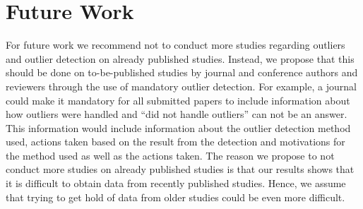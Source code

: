 ﻿\section{Future Work}
For future work we recommend not to conduct more studies regarding outliers and outlier detection on already published studies. Instead, we propose that this should be done on to-be-published studies by journal and conference authors and reviewers through the use of mandatory outlier detection. For example, a journal could make it mandatory for all submitted papers to include information about how outliers were handled and ``did not handle outliers'' can not be an answer. This information would include information about the outlier detection method used, actions taken based on the result from the detection and motivations for the method used as well as the actions taken. The reason we propose to not conduct more studies on already published studies is that our results shows that it is difficult to obtain data from recently published studies. Hence, we assume that trying to get hold of data from older studies could be even more difficult.
